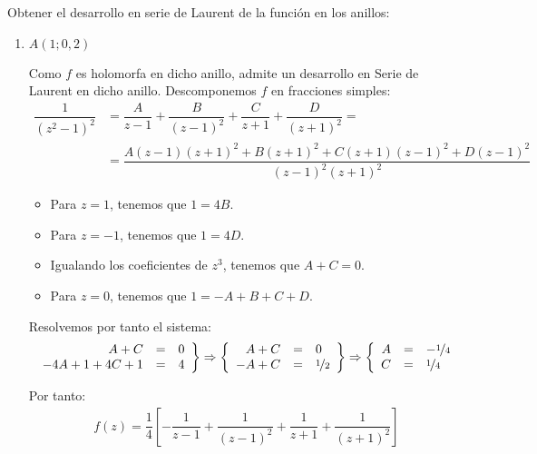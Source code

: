 \begin{ejercicio}
    Obtener el desarrollo en serie de Laurent de la función
    en los anillos:
    \begin{enumerate}
        \item $A(1; 0, 2)$
        
        Como $f$ es holomorfa en dicho anillo, admite un desarrollo en Serie de Laurent en dicho anillo. Descomponemos $f$ en fracciones simples:
        \begin{align*}
            \dfrac{1}{(z^2 - 1)^2} &= \dfrac{A}{z - 1} + \dfrac{B}{(z - 1)^2} + \dfrac{C}{z + 1} + \dfrac{D}{(z + 1)^2}
            =\\&= \dfrac{A(z -1)(z + 1)^2 + B(z + 1)^2 + C(z +1)(z - 1)^2 + D(z - 1)^2}{(z - 1)^2(z + 1)^2}
        \end{align*}
        \begin{itemize}
            \item Para $z=1$, tenemos que $1 = 4B$.
            \item Para $z=-1$, tenemos que $1 = 4D$.
            \item Igualando los coeficientes de $z^3$, tenemos que $A + C = 0$.
            \item Para $z=0$, tenemos que $1 = -A + B + C + D$.
        \end{itemize}

        Resolvemos por tanto el sistema:
        \begin{align*}
            \left.\begin{array}{rcl}
                A + C &=& 0\\
                -4A + 1 + 4C + 1 &=& 4
            \end{array}\right\}
            \Rightarrow
            \left\{\begin{array}{rcl}
                A + C &=& 0\\
                -A + C &=& \nicefrac{1}{2}
            \end{array}\right\}
            \Rightarrow
            \left\{\begin{array}{rcl}
                A &=& -\nicefrac{1}{4}\\
                C &=& \nicefrac{1}{4}
            \end{array}\right.
        \end{align*}

        Por tanto:
        \begin{align*}
            f(z) = \dfrac{1}{4}\left[-\dfrac{1}{z-1} + \dfrac{1}{(z-1)^2} + \dfrac{1}{z+1} + \dfrac{1}{(z+1)^2}\right]
        \end{align*}


\end{enumerate}
\end{ejercicio}
